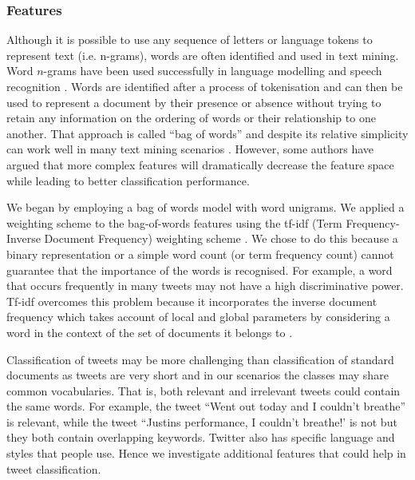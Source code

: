 \documentclass[10pt,letterpaper]{article}
\begin{document}
\subsubsection{Features}
Although it is possible to use any sequence of letters or language tokens to represent text (i.e. n-grams),  words are often identified and used in text mining.  Word $n$-grams have been used successfully in language modelling and speech recognition \cite{REF33,REF35, REF34}. Words are identified after a process of tokenisation and can then be used to represent a document by their presence or absence without trying to retain any information on the ordering of words or their relationship to one another.  That approach is called ``bag of words''  and despite its relative simplicity can work well in many text mining scenarios \cite{REF58}.  However, some authors  \cite{REF17, REF18, REF56} have argued that more complex features will dramatically decrease the feature space while leading to better classification performance.

We began by employing a bag of words model with word unigrams. We applied a weighting scheme to the bag-of-words features using the tf-idf (Term Frequency-Inverse Document Frequency) weighting scheme \cite{REF59}. We chose to do this because a binary representation or a simple word count (or term frequency count) cannot guarantee that the importance of the words is recognised.  For example, a word that occurs frequently in many tweets may not have a high discriminative power. Tf-idf overcomes this problem because it incorporates the inverse document frequency which takes account of local and global parameters by considering a word in the context of the set of documents it belongs to \cite{REF27}.

Classification of tweets may be more challenging than classification of standard documents as tweets are very short and in our scenarios the classes may share common vocabularies. That is, both relevant and irrelevant tweets could contain the same words. For example, the tweet ``Went out today and I couldn't breathe'' is relevant, while the tweet ``Justins performance, I couldn't breathe!' is not but they both contain overlapping keywords. Twitter also has specific language and styles that people use. Hence we investigate additional features that could help in tweet classification.  
\end{document}
